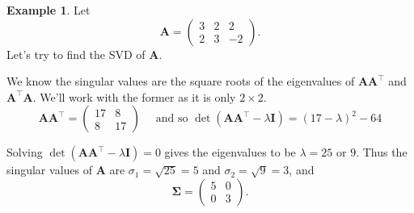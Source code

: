 \documentclass[
]{book}
\theoremstyle{definition}
\theoremstyle{definition}
\newtheorem{example}{Example}[chapter]
\theoremstyle{definition}
\theoremstyle{definition}
\theoremstyle{remark}
\begin{document}
\begin{example}
\protect\hypertarget{exm:svd2}{}\label{exm:svd2}Let
\[\mathbf A= \left(\begin{array}{ccc}3&2&2\\
               2&3&-2\end{array}\right).\]
Let's try to find the SVD of \(\mathbf A\).

We know the singular values are the square roots of the eigenvalues of \(\mathbf A\mathbf A^\top\) and \(\mathbf A^\top\mathbf A\). We'll work with the former as it is only \(2\times 2\).
\[\mathbf A\mathbf A^\top =  \left(\begin{array}{cc}17&8\\
               8&17\end{array}\right) \quad \mbox{ and so } \det(\mathbf A\mathbf A^\top-\lambda \mathbf I)=(17-\lambda)^2-64
\]

Solving \(\det(\mathbf A\mathbf A^\top-\lambda \mathbf I)=0\) gives the eigenvalues to be \(\lambda=25\) or \(9\). Thus the singular values of \(\mathbf A\) are \(\sigma_1=\sqrt{25}=5\) and \(\sigma_2=\sqrt{9}=3\), and
\[\boldsymbol{\Sigma}=\left(\begin{array}{cc}5&0\\
               0&3\end{array}\right).\]


\end{example}
\end{document}
